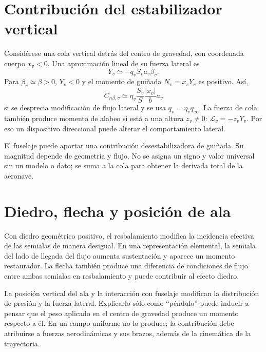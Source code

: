 
\section{Contribución del estabilizador vertical}
Considérese una cola vertical detrás del centro de gravedad, con coordenada cuerpo $x_v<0$. Una aproximación lineal de su fuerza lateral es
\begin{equation}
Y_v\simeq-q_vS_va_v\beta_v.
\end{equation}
Para $\beta_v\simeq\beta>0$, $Y_v<0$ y el momento de guiñada $N_v=x_vY_v$ es positivo. Así,
\begin{equation}
C_{n\beta,v}\simeq\eta_v\frac{S_v}{S}\frac{|x_v|}{b}a_v
\end{equation}
si se desprecia modificación de flujo lateral y se usa $q_v=\eta_vq_\infty$. La fuerza de cola también produce momento de alabeo si está a una altura $z_v\neq0$: $\mathcal L_v=-z_vY_v$. Por eso un dispositivo direccional puede alterar el comportamiento lateral.

El fuselaje puede aportar una contribución desestabilizadora de guiñada. Su magnitud depende de geometría y flujo. No se asigna un signo y valor universal sin un modelo o dato; se suma a la cola para obtener la derivada total de la aeronave.

\section{Diedro, flecha y posición de ala}
Con diedro geométrico positivo, el resbalamiento modifica la incidencia efectiva de las semialas de manera desigual. En una representación elemental, la semiala del lado de llegada del flujo aumenta sustentación y aparece un momento restaurador. La flecha también produce una diferencia de condiciones de flujo entre ambas semialas en resbalamiento y puede contribuir al efecto diedro.

La posición vertical del ala y la interacción con fuselaje modifican la distribución de presión y la fuerza lateral. Explicarlo sólo como ``péndulo'' puede inducir a pensar que el peso aplicado en el centro de gravedad produce un momento respecto a él. En un campo uniforme no lo produce; la contribución debe atribuirse a fuerzas aerodinámicas y sus brazos, además de la cinemática de la trayectoria.

